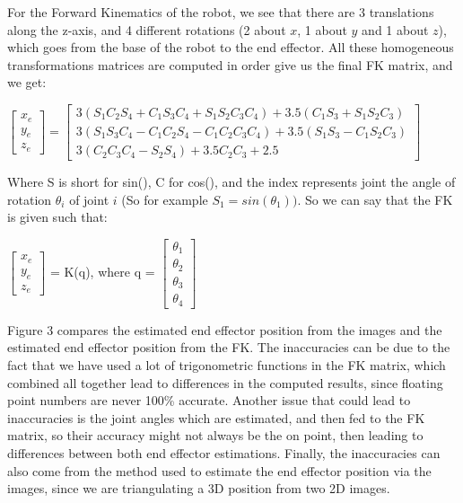\documentclass{article}
\begin{document}
For the Forward Kinematics of the robot, we see that there are 3 translations along the z-axis, and 4 different rotations (2 about $x$, 1 about $y$ and 1 about $z$), which goes from the base of the robot to the end effector. All these homogeneous transformations matrices  are computed in order give us the final FK matrix, and we get: \\
\begin{center}
    $\begin{bmatrix}
        x_e\\
        y_e\\
        z_e
    \end{bmatrix} 
    = 
    \begin{bmatrix}
        3(S_1C_2S_4 + C_1S_3C_4 + S_1S_2C_3C_4) + 3.5(C_1S_3 + S_1S_2C_3)\\
        3(S_1S_3C_4 - C_1C_2S_4 - C_1C_2C_3C_4) + 3.5(S_1S_3 - C_1S_2C_3)\\
        3(C_2C_3C_4 - S_2S_4) + 3.5C_2C_3 + 2.5
    \end{bmatrix}
    $
\end{center}

Where S is short for sin(), C for cos(), and the index represents joint the angle of rotation $\theta_i$ of joint $i$ (So for example $S_1 = sin(\theta_1))$. So we can say that the FK is given such that: \\ 
\begin{center}
    $\begin{bmatrix}
        x_e\\
        y_e\\
        z_e
    \end{bmatrix}$ 
    = K(q), where q = 
    $\begin{bmatrix}
        \theta_1 \\
        \theta_2 \\
        \theta_3 \\
        \theta_4
    \end{bmatrix}
    $
\end{center}

Figure 3 compares the estimated end effector position from the images and the estimated end effector position from the FK. The inaccuracies can be due to the fact that we have used a lot of trigonometric functions in the FK matrix, which combined all together lead to differences in the computed results,
since floating point numbers are never 100\% accurate. Another issue that could lead to inaccuracies is the joint angles which are estimated, and then fed to the FK matrix, so their accuracy might not always be the on point,
then leading to differences between both end effector estimations. Finally, the inaccuracies can also come from the method used to estimate the end effector position via the images, since we are triangulating a 3D position from two 2D images. \\
\end{document}
